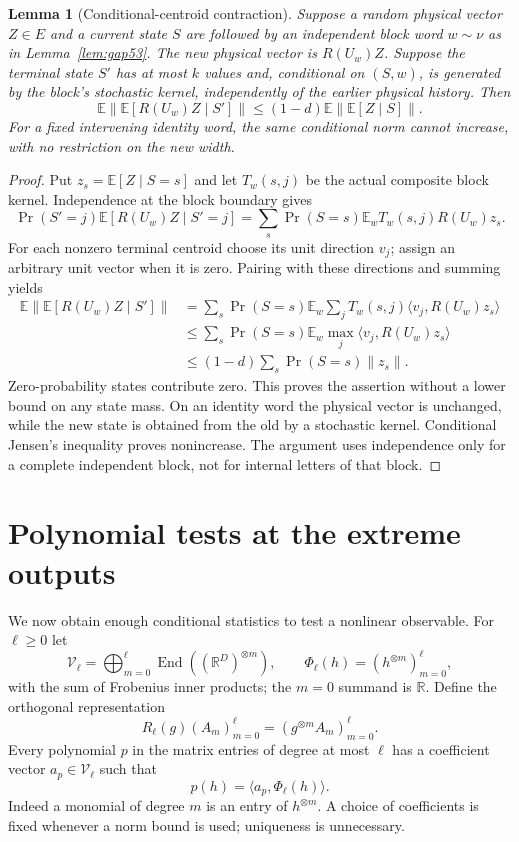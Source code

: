 \documentclass[11pt]{amsart}
\numberwithin{equation}{section}
\newtheorem{lemma}[theorem]{Lemma}
\theoremstyle{definition}
\theoremstyle{remark}
\newcommand{\R}{\mathbb R}
\newcommand{\E}{\mathbb E}
\newcommand{\ip}[2]{\langle #1,#2\rangle}
\newcommand{\norm}[1]{\lVert #1\rVert}
\DeclareMathOperator{\End}{End}
\begin{document}
\begin{lemma}[Conditional-centroid contraction]\label{lem:centroid53}
Suppose a random physical vector $Z\in E$ and a current state $S$ are followed by an independent block word $w\sim\nu$ as in Lemma~\ref{lem:gap53}. The new physical vector is $R(U_w)Z$. Suppose the terminal state $S'$ has at most $k$ values and, conditional on $(S,w)$, is generated by the block's stochastic kernel, independently of the earlier physical history. Then
\begin{equation}\label{eq:centroid53}
 \E\norm{\E[R(U_w)Z\mid S']}\le(1-d)\E\norm{\E[Z\mid S]}.
\end{equation}
For a fixed intervening identity word, the same conditional norm cannot increase, with no restriction on the new width.
\end{lemma}
\begin{proof}
Put $z_s=\E[Z\mid S=s]$ and let $T_w(s,j)$ be the actual composite block kernel. Independence at the block boundary gives
\[
 \Pr(S'=j)\E[R(U_w)Z\mid S'=j]
 =\sum_s\Pr(S=s)\E_w T_w(s,j)R(U_w)z_s.
\]
For each nonzero terminal centroid choose its unit direction $v_j$; assign an arbitrary unit vector when it is zero. Pairing with these directions and summing yields
\begin{align*}
 \E\norm{\E[R(U_w)Z\mid S']}
 &=\sum_s\Pr(S=s)\E_w\sum_jT_w(s,j)\ip{v_j}{R(U_w)z_s}\\
 &\le\sum_s\Pr(S=s)\E_w\max_j\ip{v_j}{R(U_w)z_s}\\
 &\le(1-d)\sum_s\Pr(S=s)\norm{z_s}.
\end{align*}
Zero-probability states contribute zero. This proves the assertion without a lower bound on any state mass. On an identity word the physical vector is unchanged, while the new state is obtained from the old by a stochastic kernel. Conditional Jensen's inequality proves nonincrease. The argument uses independence only for a complete independent block, not for internal letters of that block.
\end{proof}

\section{Polynomial tests at the extreme outputs}\label{sec:polynomial53}
We now obtain enough conditional statistics to test a nonlinear observable. For $\ell\ge0$ let
\[
 \mathcal V_\ell=\bigoplus_{m=0}^{\ell}\End((\R^D)^{\otimes m}),\qquad
 \Phi_\ell(h)=(h^{\otimes m})_{m=0}^{\ell},
\]
with the sum of Frobenius inner products; the $m=0$ summand is $\R$. Define the orthogonal representation
\[
 R_\ell(g)(A_m)_{m=0}^{\ell}=(g^{\otimes m}A_m)_{m=0}^{\ell}.
\]
Every polynomial $p$ in the matrix entries of degree at most $\ell$ has a coefficient vector $a_p\in\mathcal V_\ell$ such that
\begin{equation}\label{eq:polyrep53}
 p(h)=\ip{a_p}{\Phi_\ell(h)}.
\end{equation}
Indeed a monomial of degree $m$ is an entry of $h^{\otimes m}$. A choice of coefficients is fixed whenever a norm bound is used; uniqueness is unnecessary.
\end{document}
